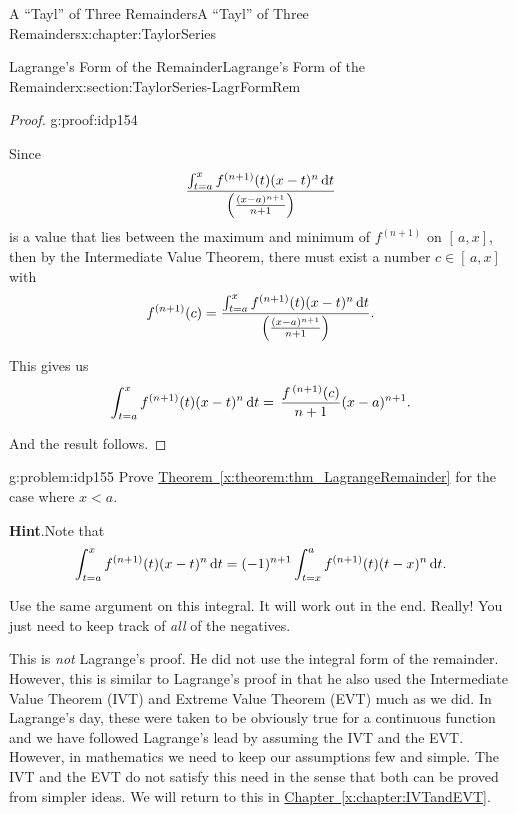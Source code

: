 \begin{chapterptx}{A ``Tayl'' of Three Remainders}{}{A ``Tayl'' of Three Remainders}{}{}{x:chapter:TaylorSeries}
\begin{sectionptx}{Lagrange's Form of the Remainder}{}{Lagrange's Form of the Remainder}{}{}{x:section:TaylorSeries-LagrFormRem}
\begin{proof}{}{g:proof:idp154}
\begin{equation*}
			\end{equation*}
			\par
			Since%
			\begin{equation*}
				\frac{\int_{t=a}^xf^{(n+1)}(t)(x-t)^n\,{\rm d} t}{\left(\frac{(x-a)^{n+1}}{n+1} \right)}
			\end{equation*}
			is a value that lies between the maximum and minimum of \(f^{(n+1)}\) on \([\,a,x]\), then by the Intermediate Value Theorem, there must exist a number \(c\in[\,a,x]\) with%
			\begin{equation*}
				f^{(n+1)}(c)=\frac{\int_{t=a}^xf^{(n+1)}(t)(x-t)^n\,{\rm d} t}{\left( \frac{(x-a)^{n+1}}{n+1}\right)}\text{.}
			\end{equation*}
			\par
			This gives us%
			\begin{equation*}
				\int_{t=a}^xf^{(n+1)}(t)(x-t)^n\,{\rm d} t=\,\frac{f^{\,(n+1)}(c)}{n+1}(x-a)^{n+1}\text{.}
			\end{equation*}
			\par
			And the result follows.%
		\end{proof}
		\begin{problem}{}{g:problem:idp155}%
			 Prove \hyperref[x:theorem:thm_LagrangeRemainder]{Theorem~{\xreffont\ref{x:theorem:thm_LagrangeRemainder}}} for the case where \(x\lt a\).%
			\par\smallskip%
			\noindent\textbf{\blocktitlefont Hint}.\hypertarget{g:hint:idp156}{}\quad{}Note that%
			\begin{equation*}
				\int_{t=a}^xf^{(n+1)}(t)(x-t)^n\,{\rm d} t=(-1)^{n+1}\int_{t=x}^af^{(n+1)}(t)(t-x)^n\,{\rm d} t\text{.}
			\end{equation*}
			\par
			Use the same argument on this integral.  It will work out in the end.  Really!  You just need to keep track of \emph{all} of the negatives.%
		\end{problem}
		This is \emph{not} Lagrange's proof.  He did not use the integral form of the remainder.  However, this is similar to Lagrange's proof in that he also used the Intermediate Value Theorem (IVT)  and Extreme Value Theorem (EVT)  much as we did.  In Lagrange's day, these were taken to be obviously true for a continuous function and we have followed Lagrange's  lead by assuming the IVT and the EVT. However, in mathematics we need to keep our assumptions few and simple.  The IVT and the EVT do not satisfy this need in the sense that both can be proved from simpler ideas.  We will return to this in \hyperref[x:chapter:IVTandEVT]{Chapter~{\xreffont\ref{x:chapter:IVTandEVT}}}.%

\end{sectionptx}
\end{chapterptx}
